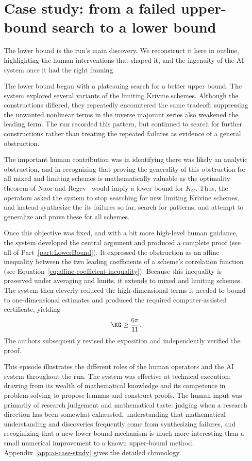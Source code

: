 \section{Case study: from a failed upper-bound search to a lower bound}
\label{sec:ai-case-study}

The lower bound is the run's main discovery. We reconstruct it here in
outline, highlighting the human interventions that shaped it, and the ingenuity of the AI system once it had the right framing.

The lower bound began with a plateauing search for a better upper bound. The system explored several variants of the limiting Krivine schemes. Although the constructions differed, they repeatedly encountered
the same tradeoff: suppressing the unwanted nonlinear terms in the inverse majorant series also weakened
the leading term. The run recorded this pattern, but continued to search
for further constructions rather than treating the repeated failures as
evidence of a general obstruction.

The important human contribution was in identifying there was likely an analytic obstruction, and in recognizing that proving the generality of this obstruction for all mixed and limiting schemes is mathematically valuable as the optimality theorem of Naor and Regev~\cite{naor2014krivine} would imply a lower bound for $K_G$. Thus, the operators asked the system to stop searching for new limiting Krivine schemes, and instead synthesize the its failures so far, search for patterns, and attempt to generalize and prove these for all schemes.

Once this objective was fixed, and with a bit more high-level human guidance, the system developed the central argument
and produced a complete proof (see all of Part~\ref{part:LowerBound}). It expressed the obstruction as an
affine inequality between the two leading coefficients of a scheme's
correlation function (see Equation~\ref{eq:affine-coefficient-inequality}). Because this inequality is preserved under averaging
and limits, it extends to mixed and limiting schemes. The system then
cleverly reduced the high-dimensional terms it needed to bound to one-dimensional estimates and produced
the required computer-assisted certificate, yielding
\[
    \KG \geq \frac{6\pi}{11}.
\]
The authors subsequently revised the exposition and independently verified
the proof.

This episode illustrates the different roles of the human operators and the AI system throughout the run. The system was effective at technical execution: drawing from its wealth of mathematical knowledge and its competence in problem-solving to propose lemmas and construct proofs. The human input was primarily of research judgement and mathematical taste: judging when a research direction has been somewhat exhausted, understanding that mathematical understanding and discoveries frequently come from synthesizing failures, 
and recoginizing that a new lower-bound mechanism is much more interesting than a small numerical improvement to a
known upper-bound method. Appendix~\ref{app:ai-case-study} gives the
detailed chronology.


